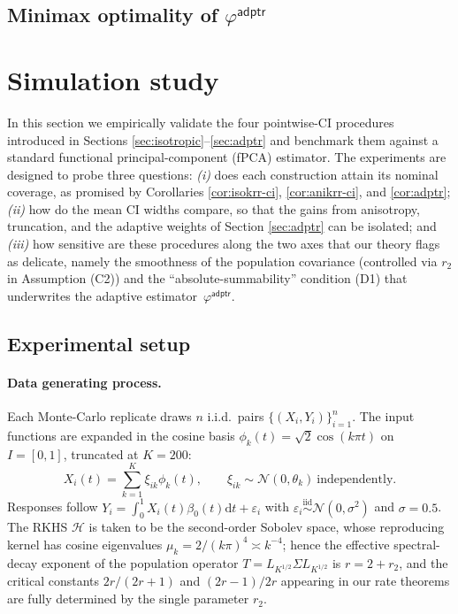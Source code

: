 \documentclass[11pt,a4paper]{article}
\theoremstyle{definition}
\theoremstyle{plain}
\theoremstyle{remark}
\newcommand{\ud}{\mathrm d}
\newcommand{\mH}{\mathcal H}
\newcommand{\adptr}{\mathsf{adptr}}
\begin{document}
\subsection{Minimax optimality of $\varphi^{\adptr}$}


\section{Simulation study}\label{sec:simulation}

In this section we empirically validate the four pointwise-CI procedures introduced in Sections \ref{sec:isotropic}--\ref{sec:adptr} and benchmark them against a standard functional principal-component (fPCA) estimator. The experiments are designed to probe three questions: \emph{(i)} does each construction attain its nominal coverage, as promised by Corollaries \ref{cor:isokrr-ci}, \ref{cor:anikrr-ci}, and \ref{cor:adptr}; \emph{(ii)} how do the mean CI widths compare, so that the gains from anisotropy, truncation, and the adaptive weights of Section \ref{sec:adptr} can be isolated; and \emph{(iii)} how sensitive are these procedures along the two axes that our theory flags as delicate, namely the smoothness of the population covariance (controlled via $r_2$ in Assumption (C2)) and the ``absolute-summability'' condition (D1) that underwrites the adaptive estimator~$\varphi^{\adptr}$.

\subsection{Experimental setup}\label{subsec:sim-setup}

\paragraph{Data generating process.}
Each Monte-Carlo replicate draws $n$ i.i.d.\ pairs $\{(X_i,Y_i)\}_{i=1}^n$. The input functions are expanded in the cosine basis $\phi_k(t)=\sqrt{2}\cos(k\pi t)$ on $I=[0,1]$, truncated at $K=200$:
\[
X_i(t)=\sum_{k=1}^{K}\xi_{ik}\phi_k(t),\qquad \xi_{ik}\sim\mathcal N(0,\theta_k)\ \text{independently}.
\]
Responses follow $Y_i=\int_0^1 X_i(t)\beta_0(t)\ud t+\varepsilon_i$ with $\varepsilon_i\stackrel{\text{iid}}{\sim}\mathcal N(0,\sigma^2)$ and $\sigma=0.5$. The RKHS $\mH$ is taken to be the second-order Sobolev space, whose reproducing kernel has cosine eigenvalues $\mu_k=2/(k\pi)^4\asymp k^{-4}$; hence the effective spectral-decay exponent of the population operator $T=L_{K^{1/2}}\Sigma L_{K^{1/2}}$ is $r=2+r_2$, and the critical constants $2r/(2r+1)$ and $(2r-1)/2r$ appearing in our rate theorems are fully determined by the single parameter $r_2$.
\end{document}
